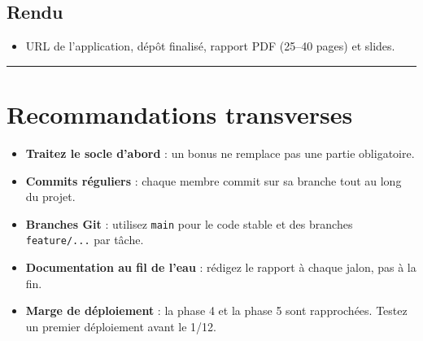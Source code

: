 \documentclass[11pt,a4paper]{article}
\providecommand{\tightlist}{\setlength{\itemsep}{0pt}\setlength{\parskip}{0pt}}
\begin{document}
\subsection{Rendu}\label{rendu-4}

\begin{itemize}
\tightlist
\item
  URL de l'application, dépôt finalisé, rapport PDF (25--40 pages) et
  slides.
\end{itemize}

\begin{center}\rule{0.5\linewidth}{0.5pt}\end{center}

\section{Recommandations transverses}\label{recommandations-transverses}

\begin{itemize}
\tightlist
\item
  \textbf{Traitez le socle d'abord} : un bonus ne remplace pas une
  partie obligatoire.
\item
  \textbf{Commits réguliers} : chaque membre commit sur sa branche tout
  au long du projet.
\item
  \textbf{Branches Git} : utilisez \texttt{main} pour le code stable et
  des branches \texttt{feature/...} par tâche.
\item
  \textbf{Documentation au fil de l'eau} : rédigez le rapport à chaque
  jalon, pas à la fin.
\item
  \textbf{Marge de déploiement} : la phase 4 et la phase 5 sont
  rapprochées. Testez un premier déploiement avant le 1/12.
\end{itemize}
\end{document}
